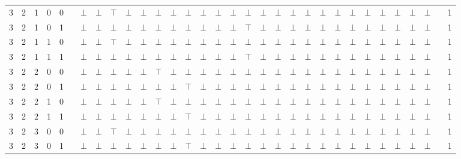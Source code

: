 \documentclass[12pt]{extarticle}
\begin{document}
\begin{landscape}
\begin{tiny}
\begin{longtable}[c]{llllllllllllllllllllllllllllllll}
3 & 2 & 1 & 0 & 0 &  & $\bot$ & $\bot$ & $\top$ & $\bot$ & $\bot$ & $\bot$ & $\bot$ & $\bot$ & $\bot$ & $\bot$ & $\bot$ & $\bot$ & $\bot$ & $\bot$ & $\bot$ & $\bot$ & $\bot$ & $\bot$ & $\bot$ & $\bot$ & $\bot$ & $\bot$ & $\bot$ & $\bot$ &  & 1 \\
3 & 2 & 1 & 0 & 1 &  & $\bot$ & $\bot$ & $\bot$ & $\bot$ & $\bot$ & $\bot$ & $\bot$ & $\bot$ & $\bot$ & $\bot$ & $\bot$ & $\top$ & $\bot$ & $\bot$ & $\bot$ & $\bot$ & $\bot$ & $\bot$ & $\bot$ & $\bot$ & $\bot$ & $\bot$ & $\bot$ & $\bot$ &  & 1 \\
3 & 2 & 1 & 1 & 0 &  & $\bot$ & $\bot$ & $\top$ & $\bot$ & $\bot$ & $\bot$ & $\bot$ & $\bot$ & $\bot$ & $\bot$ & $\bot$ & $\bot$ & $\bot$ & $\bot$ & $\bot$ & $\bot$ & $\bot$ & $\bot$ & $\bot$ & $\bot$ & $\bot$ & $\bot$ & $\bot$ & $\bot$ &  & 1 \\
3 & 2 & 1 & 1 & 1 &  & $\bot$ & $\bot$ & $\bot$ & $\bot$ & $\bot$ & $\bot$ & $\bot$ & $\bot$ & $\bot$ & $\bot$ & $\bot$ & $\top$ & $\bot$ & $\bot$ & $\bot$ & $\bot$ & $\bot$ & $\bot$ & $\bot$ & $\bot$ & $\bot$ & $\bot$ & $\bot$ & $\bot$ &  & 1 \\
3 & 2 & 2 & 0 & 0 &  & $\bot$ & $\bot$ & $\bot$ & $\bot$ & $\bot$ & $\top$ & $\bot$ & $\bot$ & $\bot$ & $\bot$ & $\bot$ & $\bot$ & $\bot$ & $\bot$ & $\bot$ & $\bot$ & $\bot$ & $\bot$ & $\bot$ & $\bot$ & $\bot$ & $\bot$ & $\bot$ & $\bot$ &  & 1 \\
3 & 2 & 2 & 0 & 1 &  & $\bot$ & $\bot$ & $\bot$ & $\bot$ & $\bot$ & $\bot$ & $\bot$ & $\top$ & $\bot$ & $\bot$ & $\bot$ & $\bot$ & $\bot$ & $\bot$ & $\bot$ & $\bot$ & $\bot$ & $\bot$ & $\bot$ & $\bot$ & $\bot$ & $\bot$ & $\bot$ & $\bot$ &  & 1 \\
3 & 2 & 2 & 1 & 0 &  & $\bot$ & $\bot$ & $\bot$ & $\bot$ & $\bot$ & $\top$ & $\bot$ & $\bot$ & $\bot$ & $\bot$ & $\bot$ & $\bot$ & $\bot$ & $\bot$ & $\bot$ & $\bot$ & $\bot$ & $\bot$ & $\bot$ & $\bot$ & $\bot$ & $\bot$ & $\bot$ & $\bot$ &  & 1 \\
3 & 2 & 2 & 1 & 1 &  & $\bot$ & $\bot$ & $\bot$ & $\bot$ & $\bot$ & $\bot$ & $\bot$ & $\top$ & $\bot$ & $\bot$ & $\bot$ & $\bot$ & $\bot$ & $\bot$ & $\bot$ & $\bot$ & $\bot$ & $\bot$ & $\bot$ & $\bot$ & $\bot$ & $\bot$ & $\bot$ & $\bot$ &  & 1 \\
3 & 2 & 3 & 0 & 0 &  & $\bot$ & $\bot$ & $\top$ & $\bot$ & $\bot$ & $\bot$ & $\bot$ & $\bot$ & $\bot$ & $\bot$ & $\bot$ & $\bot$ & $\bot$ & $\bot$ & $\bot$ & $\bot$ & $\bot$ & $\bot$ & $\bot$ & $\bot$ & $\bot$ & $\bot$ & $\bot$ & $\bot$ &  & 1 \\
3 & 2 & 3 & 0 & 1 &  & $\bot$ & $\bot$ & $\bot$ & $\bot$ & $\bot$ & $\bot$ & $\bot$ & $\top$ & $\bot$ & $\bot$ & $\bot$ & $\bot$ & $\bot$ & $\bot$ & $\bot$ & $\bot$ & $\bot$ & $\bot$ & $\bot$ & $\bot$ & $\bot$ & $\bot$ & $\bot$ & $\bot$ &  & 1 \\

\end{longtable}
\end{tiny}
\end{landscape}
\end{document}
